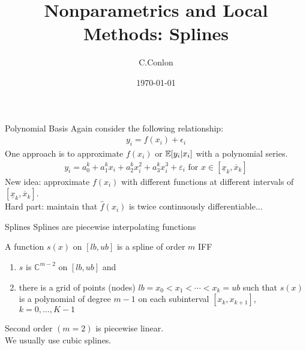 

\title [Nonparametrics]{Nonparametrics and Local Methods: Splines}
\author{C.Conlon}
\date{\today}


\begin{frame}
\titlepage
\end{frame}
\begin{frame}{Polynomial Basis}
Again consider the following relationship:
\begin{align*}
y_i = f(x_i) + \epsilon_i
\end{align*}
One approach is to approximate $f(x_i)$ or $\mathbb{E}[y_i | x_i]$ with a \alert{polynomial series}.
\begin{align*}
y_i = a_0^k  + a_1^k x_i + a_2^k x_i^2 + a_3^k x_i^3+ \varepsilon_i \text{ for } x \in [\underline{x}_k,\overline{x}_k]
\end{align*}
New idea: approximate $f(x_i)$ with \alert{different functions} at different intervals of $ [\underline{x}_k,\overline{x}_k]$.\\
Hard part: maintain that $\hat{f}(x_i)$ is twice continuously differentiable...
\end{frame}


\begin{frame}{Splines}
Splines are piecewise interpolating functions
\begin{definition} 
A function $s(x)$ on $[lb,ub]$ is a spline of order $m$ IFF
\begin{enumerate}
\item $s$ is $\mathbb{C}^{m-2}$ on $[lb,ub]$ and 
\item there is a grid of points (nodes) $lb = x_0 < x_1 < \cdots < x_k = ub$ such that $s(x)$ is a polynomial of degree $m-1$ on each subinterval $[x_k, x_{k+1}]$, $k = 0,\ldots,K-1$
\end{enumerate}
\end{definition}
Second order $(m=2)$ is piecewise linear.\\
We usually use cubic splines.
\end{frame}


